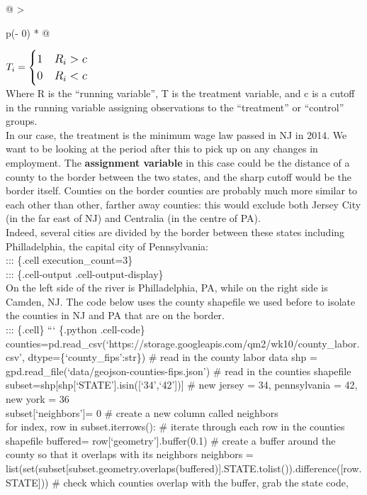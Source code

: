\documentclass[
  letterpaper,
  DIV=11,
  numbers=noendperiod]{scrreprt}
\begin{document}
\begin{longtable}[]{@{}
  >{\raggedright\arraybackslash}p{}@{}}
\(\large T_i=    \begin{cases}
1 & R_i>c\\
0 & R_i<c\\
\end{cases} \) \\
Where R is the ``running variable'', T is the treatment variable, and c
is a cutoff in the running variable assigning observations to the
``treatment'' or ``control'' groups. \\
In our case, the treatment is the minimum wage law passed in NJ in 2014.
We want to be looking at the period after this to pick up on any changes
in employment. The \textbf{assignment variable} in this case could be
the distance of a county to the border between the two states, and the
sharp cutoff would be the border itself. Counties on the border counties
are probably much more similar to each other than other, farther away
counties: this would exclude both Jersey City (in the far east of NJ)
and Centralia (in the centre of PA). \\
Indeed, several cities are divided by the border between these states
including Philladelphia, the capital city of Pennsylvania: \\
::: \{.cell execution\_count=3\} \\
::: \{.cell-output .cell-output-display\} \\
On the left side of the river is Philladelphia, PA, while on the right
side is Camden, NJ. The code below uses the county shapefile we used
before to isolate the counties in NJ and PA that are on the border. \\
::: \{.cell\} ``` \{.python .cell-code\}
counties=pd.read\_csv(`https://storage.googleapis.com/qm2/wk10/county\_labor.csv',
dtype=\{`county\_fips':str\}) \# read in the county labor data shp =
gpd.read\_file(`data/geojson-counties-fips.json') \# read in the
counties shapefile \\
subset=shp{[}shp{[}`STATE'{]}.isin({[}`34',`42'{]}){]} \# new jersey =
34, pennsylvania = 42, new york = 36 \\
subset{[}`neighbors'{]}= 0 \# create a new column called neighbors \\
for index, row in subset.iterrows(): \# iterate through each row in the
counties shapefile buffered= row{[}`geometry'{]}.buffer(0.1) \# create a
buffer around the county so that it overlaps with its neighbors
neighbors =
list(set(subset{[}subset.geometry.overlaps(buffered){]}.STATE.tolist()).difference({[}row.STATE{]}))
\# check which counties overlap with the buffer, grab the state code,

\end{longtable}
\end{document}
